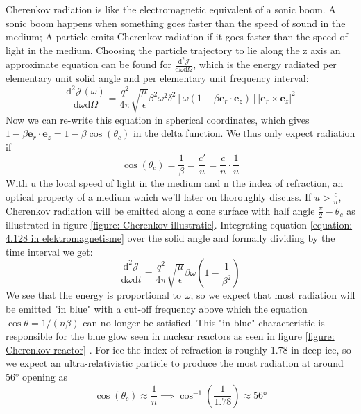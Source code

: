 Cherenkov radiation is like the electromagnetic equivalent of a sonic boom. A
sonic boom happens when something goes faster than the speed of sound in the
medium; A particle emits Cherenkov radiation if it goes faster than the speed
of light in the medium.  Choosing the particle trajectory to lie along the z
axis an approximate equation can be found\cite{jackson1998classical} for
$\frac{\text{d}^2 \mathscr{J}}{\text{d}\omega \text{d}\Omega}$, which is the energy
radiated per elementary unit solid angle and per elementary unit frequency
interval:
\begin{equation}
	\frac{\text{d}^2 \mathscr{J}(\omega)}{\text{d} \omega \text{d} \Omega} = \frac{q^2}{4\pi}\sqrt{\frac{\mu}{\epsilon}}\beta^2\omega^2\delta^2[\omega(1-\beta \mathbf{e}_r\cdot\mathbf{e}_z)]|\mathbf{e}_r\times\mathbf{e}_z|^2 \label{equation: 4.128 in elektromagnetisme}
\end{equation}
Now we can re-write this equation in spherical coordinates, which gives $1-\beta \mathbf{e}_r\cdot\mathbf{e}_z = 1-\beta\cos(\theta_c)$ in the delta function. We thus only expect radiation if
\begin{equation}
\cos(\theta_c) = \frac{1}{\beta} = \frac{c'}{u} = \frac{c}{n}\cdot\frac{1}{u}
\end{equation}
With u the local speed of light in the medium and n the index of refraction, an optical
property of a medium which we'll later on thoroughly discuss.
If $u>\frac{c}{n}$, Cherenkov radiation will
be emitted along a cone surface with half angle $\frac{\pi}{2}-\theta_c$ as
illustrated in figure \ref{figure: Cherenkov illustratie}. Integrating equation
\ref{equation: 4.128 in elektromagnetisme} over the solid angle and formally
dividing by the time interval we get:
\begin{equation}
	\frac{\text{d}^2\mathscr{J}}{\text{d}\omega \text{d}t} = \frac{q^2}{4\pi}\sqrt{\frac{\mu}{\epsilon}}\beta\omega\left(1-\frac{1}{\beta^2}\right)	
\end{equation}
We see that the energy is proportional to $\omega$, so we expect that most
radiation will be emitted "in blue" with a cut-off frequency above which the
equation $\cos\theta = 1/(n\beta)$ can no longer be satisfied. This "in blue"
characteristic is responsible for the blue glow seen in nuclear reactors as
seen in figure \ref{figure: Cherenkov reactor} .  For ice the index of
refraction is roughly 1.78 in deep ice\cite{Bogorodsky1985}, so we expect an ultra-relativistic
particle to produce the most radiation at around 56° opening as 
\begin{equation}
	\cos(\theta_c) \approx \frac{1}{n} \implies \cos^{-1}\left(\frac{1}{1.78}\right)\approx 56\text{°}
\end{equation}
